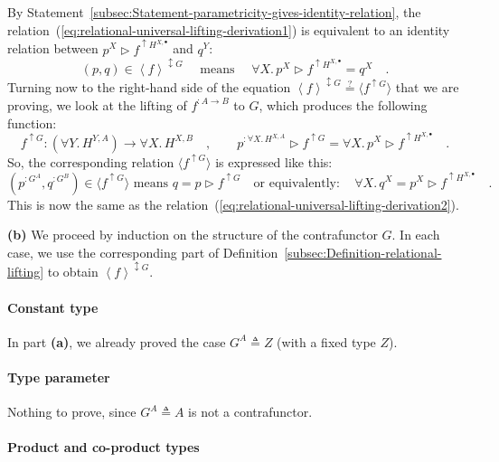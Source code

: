 By Statement~\ref{subsec:Statement-parametricity-gives-identity-relation},
the relation~(\ref{eq:relational-universal-lifting-derivation1})
is equivalent to an identity relation between $p^{X}\triangleright f^{\uparrow H^{X,\bullet}}$
and $q^{Y}$:
\begin{equation}
(p,q)\in\left<f\right>^{\updownarrow G}\quad\text{ means }\quad\forall X.\,p^{X}\triangleright f^{\uparrow H^{X,\bullet}}=q^{X}\quad.\label{eq:relational-universal-lifting-derivation2}
\end{equation}
 Turning now to the right-hand side of the equation $\left<f\right>^{\updownarrow G}\overset{?}{=}\langle f^{\uparrow G}\rangle$
that we are proving, we look at the lifting of $f^{:A\rightarrow B}$
to $G$, which produces the following function:
\[
f^{\uparrow G}:(\forall Y.\,H^{Y,A})\rightarrow\forall X.\,H^{X,B}\quad,\quad\quad p^{:\forall X.\,H^{X,A}}\triangleright f^{\uparrow G}=\forall X.\,p^{X}\triangleright f^{\uparrow H^{X,\bullet}}\quad.
\]
So, the corresponding relation $\langle f^{\uparrow G}\rangle$ is
expressed like this:
\[
(p^{:G^{A}},q^{:G^{B}})\in\langle f^{\uparrow G}\rangle\text{ means }q=p\triangleright f^{\uparrow G}\quad\text{or equivalently}:\quad\forall X.\,q^{X}=p^{X}\triangleright f^{\uparrow H^{X,\bullet}}\quad.
\]
This is now the same as the relation~(\ref{eq:relational-universal-lifting-derivation2}).

\textbf{(b)} We proceed by induction on the structure of the contrafunctor
$G$. In each case, we use the corresponding part of Definition~\ref{subsec:Definition-relational-lifting}
to obtain $\left<f\right>^{\updownarrow G}$.

\paragraph{Constant type}

In part \textbf{(a)}, we already proved the case $G^{A}\triangleq Z$
(with a fixed type $Z$).

\paragraph{Type parameter}

Nothing to prove, since $G^{A}\triangleq A$ is not a contrafunctor.

\paragraph{Product and co-product types}

